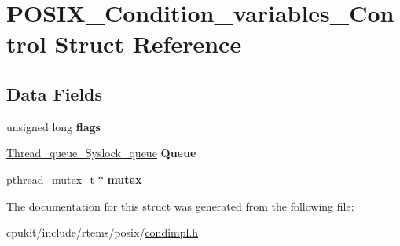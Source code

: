 \hypertarget{structPOSIX__Condition__variables__Control}{}\section{P\+O\+S\+I\+X\+\_\+\+Condition\+\_\+variables\+\_\+\+Control Struct Reference}
\label{structPOSIX__Condition__variables__Control}
\subsection*{Data Fields}
\begin{DoxyCompactItemize}
\item 
\mbox{\label{structPOSIX__Condition__variables__Control_a3099ba3f230bf960660060f28c65e431}} 
unsigned long {\bfseries flags}
\item 
\mbox{\label{structPOSIX__Condition__variables__Control_a516be0c670c18af3a2e13d005ff6fcb2}} 
\mbox{\hyperlink{structThread__queue__Syslock__queue}{Thread\+\_\+queue\+\_\+\+Syslock\+\_\+queue}} {\bfseries Queue}
\item 
\mbox{\label{structPOSIX__Condition__variables__Control_a3fbc5b65556ab4e117072369fc223c06}} 
pthread\+\_\+mutex\+\_\+t $\ast$ {\bfseries mutex}
\end{DoxyCompactItemize}


The documentation for this struct was generated from the following file\+:\begin{DoxyCompactItemize}
\item 
cpukit/include/rtems/posix/\mbox{\hyperlink{condimpl_8h}{condimpl.\+h}}\end{DoxyCompactItemize}
